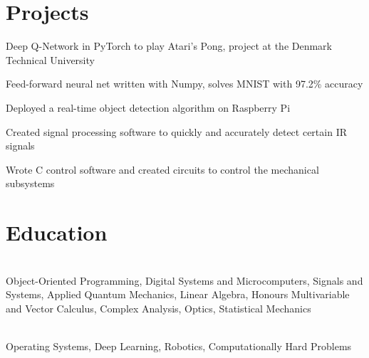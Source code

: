 \documentclass[]{deedy-resume-openfont}
\begin{document}
\section{Projects}

\begin{tightemize}
    \item Deep Q-Network in PyTorch to play Atari's Pong, project at the Denmark Technical University
	\item Feed-forward neural net written with Numpy, solves MNIST with 97.2\% accuracy
\end{tightemize}

\vspace{8pt}

\begin{tightemize}
    \item Deployed a real-time object detection algorithm on Raspberry Pi
    \item Created signal processing software to quickly and accurately detect certain IR signals
    \item Wrote C control software and created circuits to control the mechanical subsystems
\end{tightemize}

\vspace{12pt}


\section{Education}

\begin{adjustwidth}{0.55cm}{1.25cm}
     \\
     Object-Oriented Programming, Digital Systems and Microcomputers, Signals and Systems, Applied Quantum Mechanics, Linear Algebra, Honours Multivariable and Vector Calculus, Complex Analysis, Optics, Statistical Mechanics
\end{adjustwidth}
\vspace{8pt}

\begin{adjustwidth}{0.55cm}{1.25cm}
     \\
     Operating Systems, Deep Learning, Robotics, Computationally Hard Problems
\end{adjustwidth}
\end{document}
